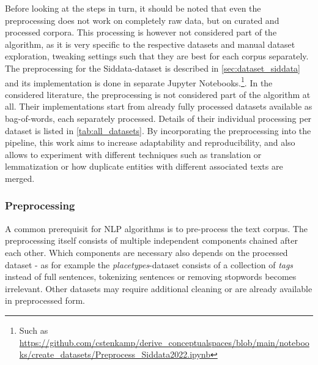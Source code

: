 Before looking at the steps in turn, it should be noted that even the preprocessing does not work on completely raw data, but on curated and processed corpora. This processing is however not considered part of the algorithm, as it is very specific to the respective datasets and manual dataset exploration, tweaking settings such that they are best for each corpus separately. The preprocessing for the Siddata-dataset is described in \autoref{sec:dataset_siddata} and its implementation is done in separate Jupyter Notebooks.\footnote{Such as \url{https://github.com/cstenkamp/derive_conceptualspaces/blob/main/notebooks/create_datasets/Preprocess_Siddata2022.ipynb}}. In the considered literature, the preprocessing is not considered part of the algorithm at all. Their implementations start from already fully processed datasets available as bag-of-words, each separately processed. Details of their individual processing per dataset is listed in \autoref{tab:all_datasets}. By incorporating the preprocessing into the pipeline, this work aims to increase adaptability and reproducibility, and also allows to experiment with different techniques such as translation or lemmatization or how duplicate entities with different associated texts are merged.

\subsubsection{Preprocessing}

\label{sec:algo_preproc}


A common prerequisit for NLP algorithms is to pre-process the text corpus. The preprocessing itself consists of multiple independent components chained after each other. Which components are necessary also depends on the processed dataset - as for example the \emph{placetypes}-dataset consists of a collection of \textit{tags} instead of full sentences, tokenizing sentences or removing \glspl{stopword} becomes irrelevant. Other datasets may require additional cleaning or are already available in preprocessed form.

